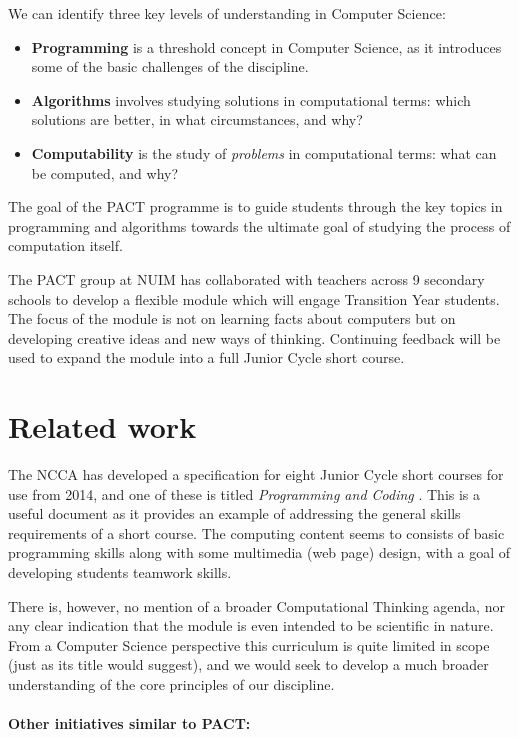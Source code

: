 \documentclass[a4paper]{article}
\begin{document}
We can identify three key levels of understanding in Computer Science:
\begin{itemize}
\item \textbf{Programming} is a threshold concept in Computer Science, as it introduces some of the basic challenges of the discipline.  
\item \textbf{Algorithms} involves studying solutions in computational terms: which solutions are better, in what circumstances, and why?
\item \textbf{Computability} is the study of \textit{problems} in 
computational terms: what can be computed, and why?
\end{itemize}

The goal of the PACT programme is to guide students through the key topics in programming and algorithms towards the ultimate goal of studying the process of computation itself.

The PACT group at NUIM has collaborated with teachers across 9 secondary schools to develop a flexible module which will engage Transition Year students.  The focus of the module is not on learning facts about computers but on developing creative ideas and new ways of thinking.  Continuing feedback will be used to expand the module into a full Junior Cycle short course. 

\section{Related work}

The NCCA has developed a specification for eight Junior Cycle short courses for use from 2014, and one of these is 
titled \textit{Programming and Coding} \cite{ncca-prog13}.  This is a useful document as it provides an example of addressing the general skills requirements of a short course.  The computing content seems to consists of basic programming skills along with some multimedia (web page) design, with a goal of developing students teamwork skills.  

There is, however, no mention of a broader Computational Thinking agenda, nor any clear indication that the module is even intended to be scientific in nature.  From a Computer Science perspective this curriculum is quite limited in scope (just as its title would suggest), and we would seek to develop a much broader understanding of the core principles of our discipline.

\paragraph{Other initiatives similar to PACT:}
\end{document}
